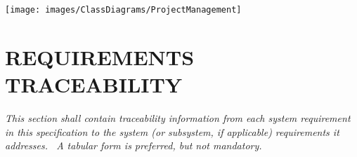 \documentclass[twoside,letterpaper]{article}
\begin{document}
{\texttt{[image: images/ClassDiagrams/ProjectManagement]}

\subparagraph[]{\rmfamily\color{black} }
\clearpage\setcounter{page}{1}\pagestyle{Convertvi}
\section[REQUIREMENTS TRACEABILITY]{\rmfamily\bfseries\color{black} REQUIREMENTS TRACEABILITY}
\hypertarget{RefHeading28459017292}{}{\itshape\color{black}
This section shall contain traceability information from each system requirement in this specification to the system (or
subsystem, if applicable) requirements it addresses. \ A tabular form is preferred, but not mandatory.}


\bigskip


}
\end{document}
